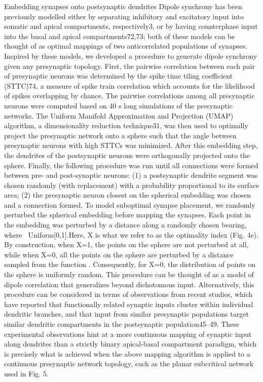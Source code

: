 Embedding synapses onto postsynaptic dendrites
Dipole synchrony has been previously modelled either by separating inhibitory and excitatory input into somatic and apical compartments, respectively3, or by having counterphase input into the basal and apical compartments72,73; both of these models can be thought of as optimal mappings of two anticorrelated populations of synapses. Inspired by these models, we developed a procedure to generate dipole synchrony given any presynaptic topology. First, the pairwise correlation between each pair of presynaptic neurons was determined by the spike time tiling coefficient (STTC)74, a measure of spike train correlation which accounts for the likelihood of spikes overlapping by chance. The pairwise correlations among all presynaptic neurons were computed based on 40 s long simulations of the presynaptic networks. The Uniform Manifold Approximation and Projection (UMAP) algorithm, a dimensionality reduction technique31, was then used to optimally project the presynaptic network onto a sphere such that the angle between presynaptic neurons with high STTCs was minimized. After this embedding step, the dendrites of the postsynaptic neurons were orthogonally projected onto the sphere. Finally, the following procedure was run until all connections were formed between pre- and post-synaptic neurons: (1) a postsynaptic dendrite segment was chosen randomly (with replacement) with a probability proportional to its surface area; (2) the presynaptic neuron closest on the spherical embedding was chosen and a connection formed. 
To model suboptimal synapse placement, we randomly perturbed the spherical embedding before mapping the synapses. Each point in the embedding was perturbed by a distance \pi{} along a randomly chosen bearing, where \alpha~Uniform[0,1].Here, X is what we refer to as the optimality index (Fig. 4e). By construction, when X=1, the points on the sphere are not perturbed at all, while when X=0, all the points on the sphere are perturbed by a distance sampled from the function \pi{}. Consequently, for X=0, the distribution of points on the sphere is uniformly random.
This procedure can be thought of as a model of dipole correlation that generalizes beyond dichotomous input. Alternatively, this procedure can be considered in terms of observations from recent studies, which have reported that functionally related synaptic inputs cluster within individual dendritic branches, and that input from similar presynaptic populations target similar dendritic compartments in the postsynaptic population45–49. These experimental observations hint at a more continuous mapping of synaptic input along dendrites than a strictly binary apical-basal compartment paradigm, which is precisely what is achieved when the above mapping algorithm is applied to a continuous presynaptic network topology, such as the planar subcritical network used in Fig. 5.

